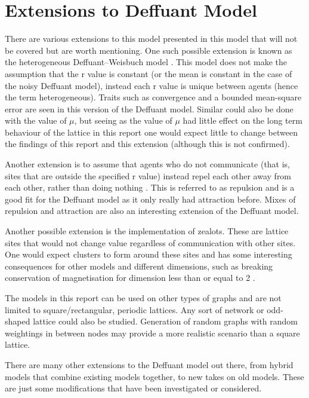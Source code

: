 \chapter{Extensions to Deffuant Model}\label{app:extension}
There are various extensions to this model presented in this model that will not be covered but are worth mentioning. One such possible extension is known as the heterogeneous Deffuant–Weisbuch model \cite{chen2020convergence}. This model does not make the assumption that the r value is constant (or the mean is constant in the case of the noisy Deffuant model), instead each r value is unique between agents (hence the term heterogeneous). Traits such as convergence and a bounded mean-square error are seen in this version of the Deffuant model. Similar could also be done with the value of $\mu$, but seeing as the value of $\mu$ had little effect on the long term behaviour of the lattice in this report one would expect little to change between the findings of this report and this extension (although this is not confirmed).

Another extension is to assume that agents who do not communicate (that is, sites that are outside the specified r value) instead repel each other away from each other, rather than doing nothing \cite{lanchier2023deffuantopiniondynamicsattraction}. This is referred to as repulsion and is a good fit for the Deffuant model as it only really had attraction before. Mixes of repulsion and attraction are also an interesting extension of the Deffuant model.

Another possible extension is the implementation of zealots. These are lattice sites that would not change value regardless of communication with other sites. One would expect clusters to form around these sites and has some interesting consequences for other models and different dimensions, such as breaking conservation of magnetisation for dimension less than or equal to 2 \cite{castellano2009statistical}.

The models in this report can be used on other types of graphs and are not limited to square/rectangular, periodic lattices. Any sort of network or odd-shaped lattice could also be studied. Generation of random graphs with random weightings in between nodes may provide a more realistic scenario than a square lattice.

There are many other extensions to the Deffuant model out there, from hybrid models that combine existing models together, to new takes on old models. These are just some modifications that have been investigated or considered.